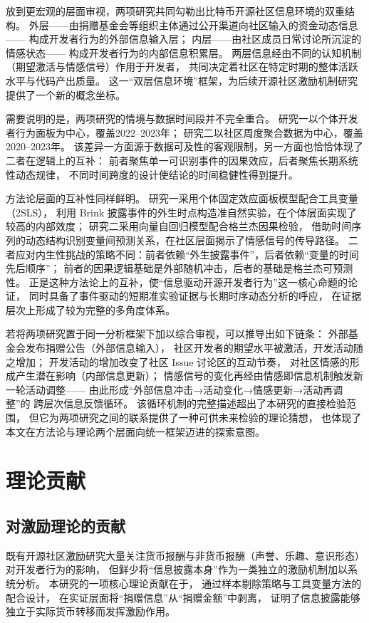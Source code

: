放到更宏观的层面审视，两项研究共同勾勒出比特币开源社区信息环境的双重结构。
外层——由捐赠基金会等组织主体通过公开渠道向社区输入的资金动态信息——
构成开发者行为的外部信息输入层；
内层——由社区成员日常讨论所沉淀的情感状态——
构成开发者行为的内部信息积累层。
两层信息经由不同的认知机制（期望激活与情感信号）作用于开发者，
共同决定着社区在特定时期的整体活跃水平与代码产出质量。
这一“双层信息环境”框架，为后续开源社区激励机制研究提供了一个新的概念坐标。

需要说明的是，两项研究的情境与数据时间段并不完全重合。
研究一以个体开发者行为面板为中心，覆盖2022--2023年；
研究二以社区周度聚合数据为中心，覆盖2020--2023年。
该差异一方面源于数据可及性的客观限制，另一方面也恰恰体现了二者在逻辑上的互补：
前者聚焦单一可识别事件的因果效应，后者聚焦长期系统性动态规律，
不同时间跨度的设计使结论的时间稳健性得到提升。

方法论层面的互补性同样鲜明。
研究一采用个体固定效应面板模型配合工具变量（2SLS），
利用 Brink 披露事件的外生时点构造准自然实验，在个体层面实现了较高的内部效度；
研究二采用向量自回归模型配合格兰杰因果检验，
借助时间序列的动态结构识别变量间预测关系，在社区层面揭示了情感信号的传导路径。
二者应对内生性挑战的策略不同：前者依赖“外生披露事件”，后者依赖“变量的时间先后顺序”；
前者的因果逻辑基础是外部随机冲击，后者的基础是格兰杰可预测性。
正是这种方法论上的互补，使“信息驱动开源开发者行为”这一核心命题的论证，
同时具备了事件驱动的短期准实验证据与长期时序动态分析的呼应，
在证据层次上形成了较为完整的多角度体系。

若将两项研究置于同一分析框架下加以综合审视，可以推导出如下链条：
外部基金会发布捐赠公告（外部信息输入），
社区开发者的期望水平被激活，开发活动随之增加；
开发活动的增加改变了社区 Issue 讨论区的互动节奏，
对社区情感的形成产生潜在影响（内部信息更新）；
情感信号的变化再经由情感即信息机制触发新一轮活动调整——
由此形成“外部信息冲击→活动变化→情感更新→活动再调整”的
跨层次信息反馈循环。
该循环机制的完整描述超出了本研究的直接检验范围，
但它为两项研究之间的联系提供了一种可供未来检验的理论猜想，
也体现了本文在方法论与理论两个层面向统一框架迈进的探索意图。


\section{理论贡献}

\subsection{对激励理论的贡献}

既有开源社区激励研究大量关注货币报酬与非货币报酬（声誉、乐趣、意识形态）
对开发者行为的影响\cite{lerner2002simple,shah2006motivation}，
但鲜少将“信息披露本身”作为一类独立的激励机制加以系统分析。
本研究的一项核心理论贡献在于，
通过样本剔除策略与工具变量方法的配合设计，
在实证层面将“捐赠信息”从“捐赠金额”中剥离，
证明了信息披露能够独立于实际货币转移而发挥激励作用。

